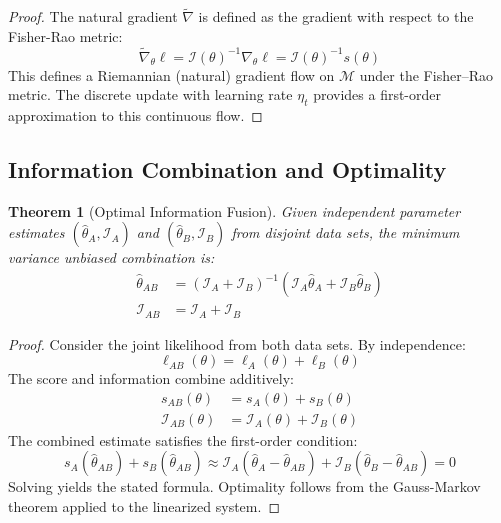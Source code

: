 \documentclass[11pt]{article}
\newtheorem{theorem}{Theorem}
\begin{document}
\begin{proof}
The natural gradient $\tilde{\nabla}$ is defined as the gradient with respect to the Fisher-Rao metric:
\begin{equation}
\tilde{\nabla}_\theta \ell = \mathcal{I}(\theta)^{-1} \nabla_\theta \ell = \mathcal{I}(\theta)^{-1} s(\theta)
\end{equation}
This defines a Riemannian (natural) gradient flow on $\mathcal{M}$ under the Fisher--Rao metric. The discrete update with learning rate $\eta_t$ provides a first-order approximation to this continuous flow.
\end{proof}

\subsection{Information Combination and Optimality}

\begin{theorem}[Optimal Information Fusion]
\label{thm:optimal_fusion}
Given independent parameter estimates $(\hat{\theta}_A, \mathcal{I}_A)$ and $(\hat{\theta}_B, \mathcal{I}_B)$ from disjoint data sets, the minimum variance unbiased combination is:
\begin{align}
\hat{\theta}_{AB} &= (\mathcal{I}_A + \mathcal{I}_B)^{-1}(\mathcal{I}_A \hat{\theta}_A + \mathcal{I}_B \hat{\theta}_B)\\
\mathcal{I}_{AB} &= \mathcal{I}_A + \mathcal{I}_B
\end{align}
\end{theorem}

\begin{proof}
Consider the joint likelihood from both data sets. By independence:
\begin{equation}
\ell_{AB}(\theta) = \ell_A(\theta) + \ell_B(\theta)
\end{equation}
The score and information combine additively:
\begin{align}
s_{AB}(\theta) &= s_A(\theta) + s_B(\theta)\\
\mathcal{I}_{AB}(\theta) &= \mathcal{I}_A(\theta) + \mathcal{I}_B(\theta)
\end{align}
The combined estimate satisfies the first-order condition:
\begin{equation}
s_A(\hat{\theta}_{AB}) + s_B(\hat{\theta}_{AB}) \approx \mathcal{I}_A(\hat{\theta}_A - \hat{\theta}_{AB}) + \mathcal{I}_B(\hat{\theta}_B - \hat{\theta}_{AB}) = 0
\end{equation}
Solving yields the stated formula. Optimality follows from the Gauss-Markov theorem applied to the linearized system.
\end{proof}
\end{document}
